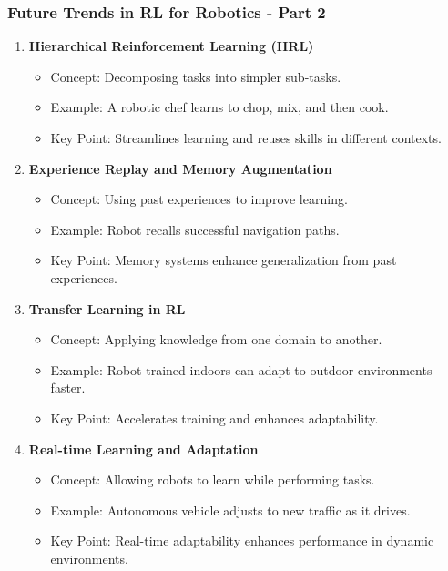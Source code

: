 \documentclass{beamer}
\begin{document}
\begin{frame}[fragile]
    \frametitle{Future Trends in RL for Robotics - Part 2}
    \begin{enumerate}
        \item \textbf{Hierarchical Reinforcement Learning (HRL)}
            \begin{itemize}
                \item Concept: Decomposing tasks into simpler sub-tasks.
                \item Example: A robotic chef learns to chop, mix, and then cook.
                \item Key Point: Streamlines learning and reuses skills in different contexts.
            \end{itemize}
        
        \item \textbf{Experience Replay and Memory Augmentation}
            \begin{itemize}
                \item Concept: Using past experiences to improve learning.
                \item Example: Robot recalls successful navigation paths.
                \item Key Point: Memory systems enhance generalization from past experiences.
            \end{itemize}
        
        \item \textbf{Transfer Learning in RL}
            \begin{itemize}
                \item Concept: Applying knowledge from one domain to another.
                \item Example: Robot trained indoors can adapt to outdoor environments faster.
                \item Key Point: Accelerates training and enhances adaptability.
            \end{itemize}
        
        \item \textbf{Real-time Learning and Adaptation}
            \begin{itemize}
                \item Concept: Allowing robots to learn while performing tasks.
                \item Example: Autonomous vehicle adjusts to new traffic as it drives.
                \item Key Point: Real-time adaptability enhances performance in dynamic environments.
            \end{itemize}
    \end{enumerate}
\end{frame}
\end{document}
